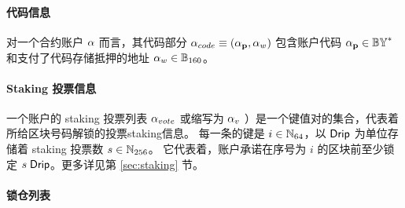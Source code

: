 

\paragraph{代码信息}

对一个合约账户 $\mathbf{\alpha}$ 而言，其代码部分 $\mathbf{\alpha}_{code}\equiv (\mathbf{\alpha}_{\bf p},\mathbf{\alpha}_{w})$ 包含账户代码 $\mathbf{\alpha}_{\bf p}\in \mathbb{BY}^*$ 和支付了代码存储抵押的地址 $\mathbf{\alpha}_{w}\in \mathbb{B}_{160}$。

\paragraph{ Staking 投票信息}

一个账户的 staking 投票列表 $\mathbf{\alpha}_{vote}$ 或缩写为 $\mathbf{\alpha}_{v}$ ）是一个键值对的集合，代表着所给区块号码解锁的投票staking信息。
每一条的键是 $i\in\mathbb{N}_{64}$，以 ${\sf Drip}$ 为单位存储着 staking 投票数 $s\in \mathbb{N}_{256}$。
它代表着，账户承诺在序号为 $i$ 的区块前至少锁定 $s\;{\sf Drip}$。更多详见第 \ref{sec:staking} 节。

\paragraph{锁仓列表}


